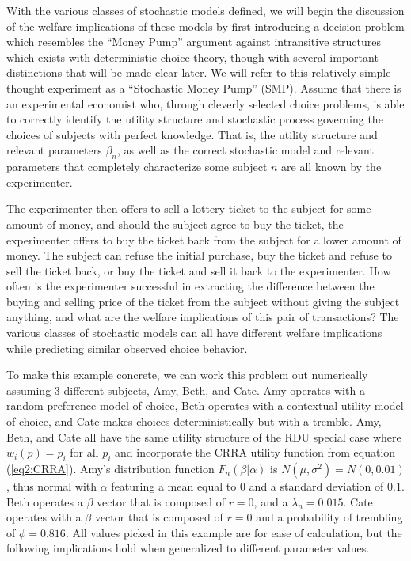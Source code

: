 \documentclass[../main.tex]{subfiles}
\begin{document}
With the various classes of stochastic models defined, we will begin the discussion of the welfare implications of these models by first introducing a decision problem which resembles the \enquote{Money Pump} argument against intransitive structures which exists with deterministic choice theory, though with several important distinctions that will be made clear later.
We will refer to this relatively simple thought experiment as a \enquote{Stochastic Money Pump} (SMP).
Assume that there is an experimental economist who, through cleverly selected choice problems, is able to correctly identify the utility structure and stochastic process governing the choices of subjects with perfect knowledge.
That is, the utility structure and relevant parameters $\beta_n$, as well as the correct stochastic model and relevant parameters that completely characterize some subject $n$ are all known by the experimenter.

The experimenter then offers to sell a lottery ticket to the subject for some amount of money, and should the subject agree to buy the ticket, the experimenter offers to buy the ticket back from the subject for a lower amount of money.
The subject can refuse the initial purchase, buy the ticket and refuse to sell the ticket back, or buy the ticket and sell it back to the experimenter.
How often is the experimenter successful in extracting the difference between the buying and selling price of the ticket from the subject without giving the subject anything, and what are the welfare implications of this pair of transactions?
The various classes of stochastic models can all have different welfare implications while predicting similar observed choice behavior.

To make this example concrete, we can work this problem out numerically assuming 3 different subjects, Amy, Beth, and Cate.
Amy operates with a random preference model of choice, Beth operates with a contextual utility model of choice, and Cate makes choices deterministically but with a tremble.
Amy, Beth, and Cate all have the same utility structure of the RDU special case where $w_i(p)=p_i$ for all $p_i$ and incorporate the CRRA utility function from equation (\ref{eq2:CRRA}).
Amy's distribution function $F_n(\beta|\alpha)$ is $N(\mu,\sigma^2) = N(0,0.01)$, thus normal with $\alpha$ featuring a mean equal to 0 and a standard deviation of 0.1.
Beth operates a $\beta$ vector that is composed of $r=0$, and a $\lambda_n = 0.015$.
Cate operates with a $\beta$ vector that is composed of $r=0$ and a probability of trembling of $\phi = 0.816$.
All values picked in this example are for ease of calculation, but the following implications hold when generalized to different parameter values.
\end{document}
